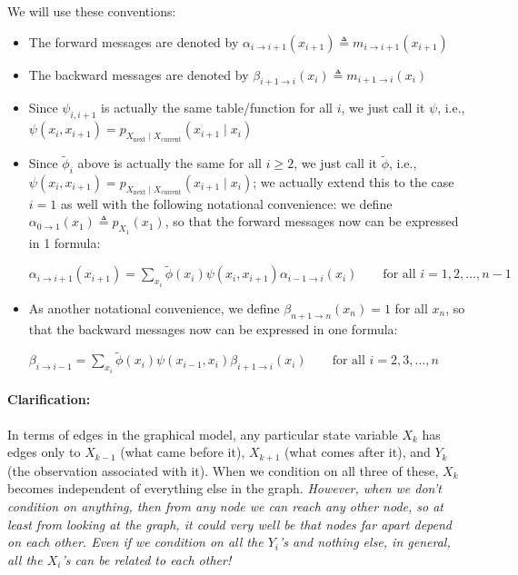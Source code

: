 \documentclass[6008notes.tex]{subfiles}
\begin{document}
We will use these conventions:

\begin{itemize}
\item The forward messages are denoted by $\alpha _{i\rightarrow i+1}(x_{i+1})\triangleq m_{i\rightarrow i+1}(x_{i+1})$

\item The backward messages are denoted by $\beta _{i+1\rightarrow i}(x_{i})\triangleq m_{i+1\rightarrow i}(x_{i})$

\item Since $\psi _{i,i+1}$ is actually the same table/function for all $i$, we just call it $\psi$, i.e., $\psi (x_{i},x_{i+1})=p_{X_{\text {next}}\mid X_{\text {current}}}(x_{i+1}\mid x_{i})$

\item Since $\widetilde{\phi}_{i}$ above is actually the same for all $i \ge 2$, we just call it $\widetilde{\phi}$, i.e., $\psi (x_{i},x_{i+1})=p_{X_{\text {next}}\mid X_{\text {current}}}(x_{i+1}\mid x_{i})$; we actually extend this to the case $i=1$ as well with the following notational convenience: we define $\alpha _{0\rightarrow 1}(x_{1})\triangleq p_{X_{1}}(x_{1})$, so that the forward messages now can be expressed in 1 formula:

{\centering$\alpha _{i\rightarrow i+1}(x_{i+1})=\sum _{x_{i}}\widetilde{\phi }(x_{i})\psi (x_{i},x_{i+1})\alpha _{i-1\rightarrow i}(x_{i})\qquad \text {for all }i=1,2,\dots ,n-1$ \par}
 
\item As another notational convenience, we define $\beta _{n+1\rightarrow n}(x_{n})=1$ for all $x_n$, so that the backward messages now can be expressed in one formula:

{\centering$\beta _{i\rightarrow i-1}=\sum _{x_{i}}\widetilde{\phi }(x_{i})\psi (x_{i-1},x_{i})\beta _{i+1\rightarrow i}(x_{i})\qquad \text {for all }i=2,3,\dots ,n$ \par}

\end{itemize}
 
\paragraph{Clarification:} In terms of edges in the graphical model, any particular state variable $X_k$ has edges only to $X_{k-1}$ (what came before it), $X_{k+1}$ (what comes after it), and $Y_k$ (the observation associated with it). When we condition on all three of these, $X_k$ becomes independent of everything else in the graph. \textit{However, when we don't condition on anything, then from any node we can reach any other node, so at least from looking at the graph, it could very well be that nodes far apart depend on each other. Even if we condition on all the $Y_i$'s and nothing else, in general, all the $X_i$'s can be related to each other!}
\end{document}

